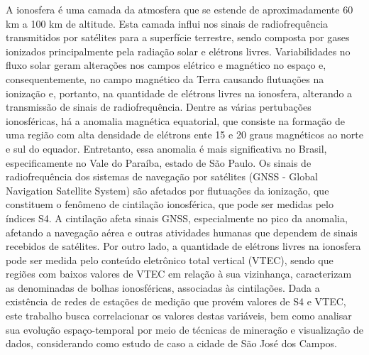 
\begin{resumo}


\hypertarget{estilo:resumo}{} %

A ionosfera é uma camada da atmosfera que se estende de aproximadamente 60 km a 100 km de altitude. Esta camada influi nos sinais de radiofrequência transmitidos por satélites para a superfície terrestre, sendo composta por gases ionizados principalmente pela radiação solar e elétrons livres. Variabilidades no fluxo solar geram alterações nos campos elétrico e magnético no espaço e, consequentemente, no campo magnético da Terra causando flutuações na ionização e, portanto, na quantidade de elétrons livres na ionosfera, alterando a transmissão de sinais de radiofrequência. Dentre as várias pertubações ionosféricas, há a anomalia magnética equatorial, que consiste na formação de uma região com alta densidade de elétrons ente 15 e 20 graus magnéticos ao norte e sul do equador. Entretanto, essa anomalia é mais significativa no Brasil, especificamente no Vale do Paraíba, estado de São Paulo. Os sinais de radiofrequência dos sistemas de navegação por satélites (GNSS - Global Navigation Satellite System) são afetados por flutuações da ionização, que constituem o fenômeno de cintilação ionosférica, que pode ser medidas pelo índices S4. A cintilação afeta sinais GNSS, especialmente no pico da anomalia, afetando a navegação aérea e outras atividades humanas que dependem de sinais recebidos de satélites.  Por outro lado, a quantidade de elétrons livres na ionosfera pode ser medida pelo conteúdo eletrônico total vertical (VTEC), sendo que regiões com baixos valores de VTEC em relação à sua vizinhança, caracterizam as denominadas de bolhas ionosféricas, associadas às cintilações. Dada a existência de redes de estações de medição que provém valores de S4 e VTEC, este trabalho busca correlacionar os valores destas variáveis, bem como analisar sua evolução espaço-temporal por meio de técnicas de mineração e visualização de dados, considerando como estudo de caso a cidade de São José dos Campos.

 
\end{resumo}
